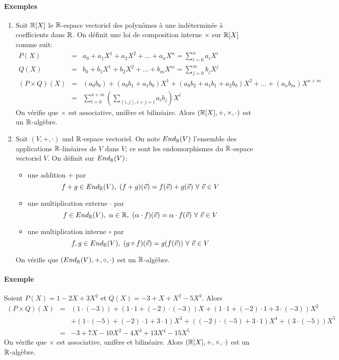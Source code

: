 \paragraph{Exemples}
\begin{enumerate}[1)]
  \item Soit $\mathbb{R}[X]$ le $\mathbb{R}$-espace vectoriel des polynômes à une indéterminée à  coefficients dans $\mathbb{R}$. On définit une loi de composition interne $\times$ sur $\mathbb{R}[X]$ comme suit:
    \begin{eqnarray*}
      P(X) &=& a_0 + a_1 X^1 + a_2 X^2 + \ldots + a_n X^n = \sum_{i=0}^{n} a_i X^i \\
      Q(X) &=& b_0 + b_1 X^1 + b_2 X^2 + \ldots + b_m X^m = \sum_{j=0}^{m} b_j X^j \\
      (P \times Q)(X) &=& (a_0 b_0) + (a_0 b_1 + a_1 b_0) X^1 + (a_0 b_2 + a_1 b_1 + a_2 b_0) X^2 + \ldots + (a_n b_m) X^{n+m} \\
        &=& \sum_{l=0}^{n+m} \left ( \sum_{(i, j), i+j=l} a_i b_j \right ) X^l
    \end{eqnarray*}
    On vérifie que $\times$ est associative, unifère et bilinéaire. Alors $(\mathbb{R}[X], + , \times, \cdot)$ est un $\mathbb{R}$-algèbre.
    
  \item Soit $(V, +, \cdot)$ und $\mathbb{R}$-espace vectoriel. On note $End_{\mathbb{R}}(V)$ l'ensemble des applications $\mathbb{R}$-linéaires de $V$ dans $V$; ce sont les endomorphismes du $\mathbb{R}$-espace vectoriel $V$. On définit sur $End_{\mathbb{R}}(V)$:
    \begin{itemize}
      \item une addition $+$ par
        $$f+g \in End_{\mathbb{R}}(V), ~ (f+g)(\vec{v}) = f(\vec{v}) + g(\vec{v}) ~ \forall ~ \vec{v} \in V$$
      \item une multiplication externe $\cdot$ par
        $$f \in End_{\mathbb{R}}(V), ~ \alpha \in \mathbb{R}, ~ (\alpha \cdot f)(\vec{v}) = \alpha \cdot f(\vec{v}) ~ \forall ~ \vec{v} \in V$$
      \item une multiplication interne $\circ$ par
        $$f, g \in End_{\mathbb{R}}(V), ~ (g \circ f)(\vec{v}) = g(f(\vec{v})) ~ \forall ~ \vec{v} \in V$$
    \end{itemize} 
    On vérifie que $(End_{\mathbb{R}}(V), +, \circ, \cdot)$ est un $\mathbb{R}$-algèbre.
\end{enumerate}

\paragraph{Exemple} Soient $P(X) = 1 - 2 X + 3 X^2$ et $Q(X) = -3 + X + X^2 - 5 X^3$. Alors
\begin{eqnarray*}
  (P \times Q)(X) &=& (1 \cdot (-3)) + (1 \cdot 1 + (-2) \cdot (-3)) X + (1 \cdot 1 + (-2) \cdot 1 + 3 \cdot (-3)) X^2 \\
    && +(1 \cdot (-5) + (-2) \cdot 1 + 3 \cdot 1) X^3 + ((-2) \cdot (-5) + 3 \cdot 1) X^4 + (3 \cdot (-5)) X^5 \\
  &=& -3 + 7 X - 10 X^2 - 4 X^3 + 13 X^4 - 15 X^5
\end{eqnarray*}
On vérifie que $\times$ est associative, unifère et bilinéaire. Alors $(\mathbb{R}[X],+ ,\times ,\cdot)$ est un $\mathbb{R}$-algèbre.

